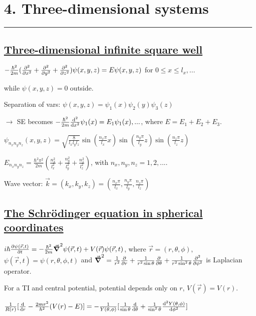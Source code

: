 \section{4. Three-dimensional systems} \hrule height 0.3pt \thinspace

\subsection{\underline{Three-dimensional infinite square well}}

$-\frac{\hbar^2}{2m}(\pdv[2]{}{x} + \pdv[2]{}{y} + \pdv[2]{}{z}) \psi(x, y, z) = E \psi(x, y, z)$ for $0 \leq x \leq l_x, ...$

while $\psi(x, y, z) = 0$ outside.

Separation of vars: $\psi(x, y, z) = \psi_1(x) \psi_2(y) \psi_3(z)$

$\rightarrow$ SE becomes $-\frac{\hbar^2}{2m} \dv[2]{}{x} \psi_1(x) = E_1 \psi_1(x), ...$, where $E = E_1 + E_2 + E_3$.

$\psi_{n_x n_y n_z}(x, y, z) = \sqrt{\frac{8}{l_x l_y l_z}} \sin(\frac{n_x \pi}{l_x} x) \sin(\frac{n_y \pi}{l_y} z) \sin(\frac{n_z \pi}{l_z} z)$

$E_{n_x n_y n_z} = \frac{\hbar^2 \pi^2}{2m} (\frac{n^2_x}{l^2_x} + \frac{n^2_y}{l^2_y} + \frac{n^2_z}{l^2_z})$, with $n_x, n_y, n_z = 1, 2, ...$.

Wave vector: $\vec{k} = (k_x, k_y, k_z) = (\frac{n_x \pi}{l_x}, \frac{n_y \pi}{l_y}, \frac{n_z \pi}{l_z})$

\subsection{\underline{The Schr\"odinger equation in spherical coordinates}}

$i \hbar \pdv{\psi(\vec{r}, t)}{t} = -\frac{\hbar^2}{2m} \vec{\grad}^2 \psi(\vec{r}, t) + V(\vec{r})\psi(\vec{r}, t)$, where $\vec{r} = (r, \theta, \phi)$, $\psi(\vec{r}, t) = \psi(r, \theta, \phi, t)$ and $\vec{\grad}^2 = \frac{1}{r^2} \pdv{}{r}(r^2 \pdv{}{r}) + \frac{1}{r^2 \sin \theta} \pdv{}{\theta} (\sin \theta \pdv{}{\theta}) + \frac{1}{r^2 \sin^2 \theta} \pdv[2]{}{\phi}$ is Laplacian operator.

For a TI and central potential, potential depends only on $r$, $V(\vec{r}) = V(r)$.

$\frac{1}{R(r)} [\dv{}{r} (r^2 \dv{R(r)}{r}) - \frac{2mr^2}{\hbar^2} (V(r) - E)] = -\frac{1}{Y(\theta, \phi)} [\frac{1}{\sin\theta} \dv{}{\theta} (\sin \theta \dv{Y(\theta, \phi)}{\theta}) + \frac{1}{\sin^2 \theta} \dv[2]{Y(\theta, \phi)}{\phi}]$

